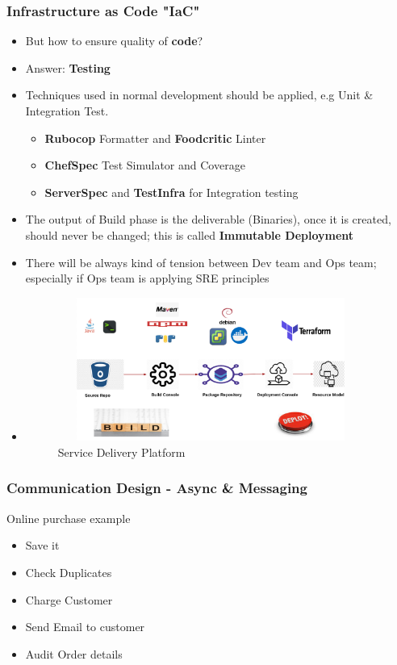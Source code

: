 \documentclass{beamer}
\begin{document}
	\begin{frame}
		\frametitle{Infrastructure as Code \textbf{"IaC"}}
		\begin{itemize}
			\item<1-> \scriptsize{\alert{But how to ensure quality of \textbf{code}?}}
			\item<2-> \scriptsize{Answer: \textbf{Testing}}
			\item<3-> \scriptsize{Techniques used in normal development should be applied, e.g Unit \& Integration Test}. 
				\begin{itemize} 
					\item \scriptsize{\textbf{Rubocop} Formatter and \textbf{Foodcritic} Linter}
					\item \scriptsize{\textbf{ChefSpec} Test Simulator and Coverage}
					\item \scriptsize{\textbf{ServerSpec} and \textbf{TestInfra} for Integration testing}
				\end{itemize}
			\item<4-> \scriptsize{The output of Build phase is the deliverable (Binaries), once it is created, should never be changed; this is called \textbf{Immutable Deployment}}
			\item<5-> \scriptsize{There will be always kind of tension between Dev team and Ops team; especially if Ops team is applying SRE principles}
			\item<1->[]
			\begin{figure}[h]
				\includegraphics[width=100mm,height= 47mm, scale=1]{img/service-delivery-platform.png}
				\caption{Service Delivery Platform}
			\end{figure}
		\end{itemize}
	\end{frame}
	
	\againframe{cd}
	
	
	\begin{frame}
		\frametitle{Communication Design - Async \& Messaging}
		Online purchase example
		\scriptsize
		\begin{itemize}
			\item<2-> Save it
			\item<3-> Check Duplicates
			\item<4-> Charge Customer
			\item<5-> Send Email to customer
			\item<6-> Audit Order details 
		\end{itemize}
	\vspace{100mm}
	\end{frame}
\end{document}
